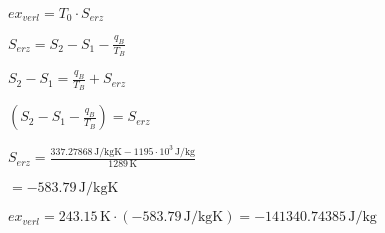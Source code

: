 \( ex_{verl} = T_0 \cdot S_{erz} \)  

\( S_{erz} = S_2 - S_1 - \frac{q_B}{T_B} \)  

\( S_2 - S_1 = \frac{q_B}{T_B} + S_{erz} \)  

\( \left(S_2 - S_1 - \frac{q_B}{T_B}\right) = S_{erz} \)  

\( S_{erz} = \frac{337.27868 \, \text{J/kgK} - 1195 \cdot 10^3 \, \text{J/kg}}{1289 \, \text{K}} \)  

\( = -583.79 \, \text{J/kgK} \)  

\( ex_{verl} = 243.15 \, \text{K} \cdot (-583.79 \, \text{J/kgK}) = -141340.74385 \, \text{J/kg} \)
